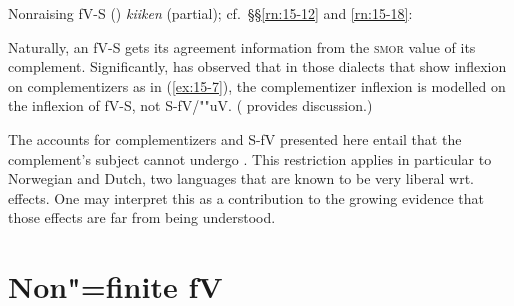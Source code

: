 \documentclass[output=paper]{LSP/langsci}
\begin{document}
\randnum\label{rn:15-34}Nonraising \mbox{fV-S} () \textit{kiiken} (partial); cf.\ §§\ref{rn:15-12} and \ref{rn:15-18}:
\begin{exe}
\ex
\end{exe}
\randnum\label{rn:15-35}Naturally, an \mbox{fV-S} gets its agreement
information from the \textsc{smor} value of its complement. Significantly,
\citet{vanHaeringen1958} has observed that in those dialects that show inflexion on
complementizers as in (\ref{ex:15-7}), the complementizer inflexion is modelled on
the inflexion of \mbox{fV-S}, not S-fV/""uV. (\citealt[Chapter~III.3]{Zwart1993} provides
 discussion.)

\randnum\label{rn:15-36}The accounts for  complementizers and S-fV presented here entail that the complement's subject cannot
undergo . This restriction applies in particular to
Norwegian and Dutch, two languages that are known to be very liberal
wrt.\  effects. One may interpret this as a contribution to
the growing evidence that those effects are far from being understood.

\section{Non"=finite fV}
\end{document}
